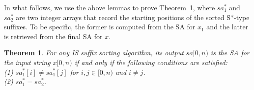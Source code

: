 \documentclass[10pt,journal,compsoc]{IEEEtran}
\newtheorem{theorem}{Theorem}[section]
\begin{document}
In what follows, we use the above lemmas to prove Theorem~\ref{theorem:2}, where $sa^*_1$ and $sa^*_2$ are two integer arrays that record the starting positions of the sorted S*-type suffixes. To be specific, the former is computed from the SA for $x_1$ and the latter is retrieved from the final SA for $x$. 

\begin{theorem} \label{theorem:2}
	For any IS suffix sorting algorithm, its output $sa[0, n)$ is the SA for the input string $x[0,n)$ if and only if the following conditions are satisfied: \\
	(1) $sa^*_1[i] \ne sa^*_1[j]$ for $i, j \in [0, n)$ and $i \ne j$. \\
	(2) $sa^*_1 = sa^*_2$. \\
\end{theorem}
\end{document}
